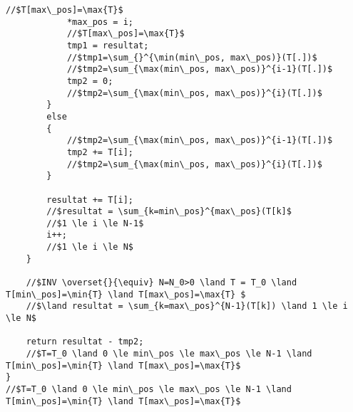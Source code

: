 \begin{lstlisting}[caption={somme.c}]
            //$T[max\_pos]=\max{T}$
            *max_pos = i;
            //$T[max\_pos]=\max{T}$
            tmp1 = resultat;
            //$tmp1=\sum_{}^{\min(min\_pos, max\_pos)}(T[.])$
            //$tmp2=\sum_{\max(min\_pos, max\_pos)}^{i-1}(T[.])$
            tmp2 = 0;
            //$tmp2=\sum_{\max(min\_pos, max\_pos)}^{i}(T[.])$
        }
        else 
        {
            //$tmp2=\sum_{\max(min\_pos, max\_pos)}^{i-1}(T[.])$
            tmp2 += T[i];
            //$tmp2=\sum_{\max(min\_pos, max\_pos)}^{i}(T[.])$
        }
        
        resultat += T[i];
        //$resultat = \sum_{k=min\_pos}^{max\_pos}(T[k]$
        //$1 \le i \le N-1$
        i++;
        //$1 \le i \le N$
    }

    //$INV \overset{}{\equiv} N=N_0>0 \land T = T_0 \land T[min\_pos]=\min{T} \land T[max\_pos]=\max{T} $
    //$\land resultat = \sum_{k=max\_pos}^{N-1}(T[k]) \land 1 \le i \le N$

    return resultat - tmp2;
    //$T=T_0 \land 0 \le min\_pos \le max\_pos \le N-1 \land T[min\_pos]=\min{T} \land T[max\_pos]=\max{T}$
}
//$T=T_0 \land 0 \le min\_pos \le max\_pos \le N-1 \land T[min\_pos]=\min{T} \land T[max\_pos]=\max{T}$
\end{lstlisting}

